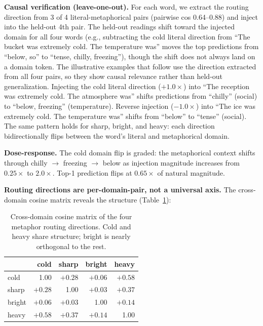 \documentclass[11pt]{article}
\begin{document}
\textbf{Causal verification (leave-one-out).} For each word, we extract the
routing direction from 3 of 4 literal-metaphorical pairs (pairwise cos
0.64--0.88) and inject into the held-out 4th pair. The held-out
readings shift toward the injected domain for all four words (e.g.,
subtracting the cold literal direction from ``The bucket was extremely
cold. The temperature was'' moves the top predictions from ``below,
so'' to ``tense, chilly, freezing''), though the shift does not always
land on a domain token. The illustrative examples that follow use the
direction extracted from all four pairs, so they show causal relevance
rather than held-out generalization. Injecting the cold literal direction ($+1.0\times$) into ``The
reception was extremely cold. The atmosphere was'' shifts predictions from
``chilly'' (social) to ``below, freezing'' (temperature). Reverse injection
($-1.0\times$) into ``The ice was extremely cold. The temperature was'' shifts from
``below'' to ``tense'' (social). The same pattern holds for sharp, bright,
and heavy: each direction bidirectionally flips between the word's literal
and metaphorical domain.

\textbf{Dose-response.} The cold domain flip is graded: the metaphorical context
shifts through chilly $\rightarrow$ freezing $\rightarrow$ below as injection magnitude increases
from $0.25\times$ to $2.0\times$. Top-1 prediction flips at $0.65\times$ of natural magnitude.

\textbf{Routing directions are per-domain-pair, not a universal axis.} The
cross-domain cosine matrix reveals the structure (Table~\ref{tab:metaphor-cos}):

\begin{table}[htbp]
\centering
\small
\begin{tabular}{lrrrr}
\toprule
 & cold & sharp & bright & heavy \\
\midrule
cold & 1.00 & $+0.28$ & $+0.06$ & $+0.58$ \\
sharp & $+0.28$ & 1.00 & $+0.03$ & $+0.37$ \\
bright & $+0.06$ & $+0.03$ & 1.00 & $+0.14$ \\
heavy & $+0.58$ & $+0.37$ & $+0.14$ & 1.00 \\
\bottomrule
\end{tabular}
\caption{Cross-domain cosine matrix of the four metaphor routing directions. Cold and heavy share structure; bright is nearly orthogonal to the rest.}
\label{tab:metaphor-cos}
\end{table}
\end{document}
